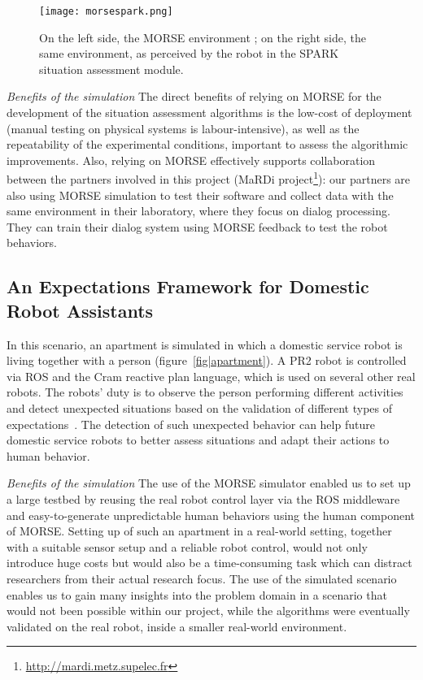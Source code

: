 \documentclass{llncs}
\begin{document}
\begin{figure}[t]
      \centering
      \texttt{[image: morsespark.png]}
      \caption{On the left side, the MORSE environment ; on the right side, the same
      environment, as perceived by the robot in the SPARK situation assessment
      module.}
      \label{fig|spark}
\end{figure}

\emph{Benefits of the simulation} The direct benefits of relying on MORSE for
the development of the situation assessment algorithms is the low-cost of
deployment (manual testing on physical systems is labour-intensive), as well as
the repeatability of the experimental conditions, important to assess the
algorithmic improvements.  Also, relying on MORSE effectively supports
collaboration between the partners involved in this project (MaRDi
project\footnote{\url{http://mardi.metz.supelec.fr}}): our partners are also
using MORSE simulation to test their software and collect data with the same
environment in their laboratory, where they focus on dialog processing. They can
train their dialog system using MORSE feedback to test the robot behaviors.

\subsection{An Expectations Framework for Domestic Robot Assistants}
\label{sc:expectations}

In this scenario, an apartment is simulated in which a domestic service robot is
living together with a person (figure~\ref{fig|apartment}).  A PR2 robot is
controlled via ROS and the {\sc Cram} reactive plan language, which is used on
several other real robots. The robots' duty is to observe the person performing
different activities and detect unexpected situations based on the validation of
different types of expectations~\cite{Karg2013}.  The detection of such
unexpected behavior can help future domestic service robots to better assess
situations and adapt their actions to human behavior.

\emph{Benefits of the simulation} The use of the MORSE simulator enabled us to
set up a large testbed by reusing the real robot control layer via the ROS
middleware and easy-to-generate unpredictable human behaviors using the human
component of MORSE. Setting up of such an apartment in a real-world setting,
together with a suitable sensor setup and a reliable robot control, would not
only introduce huge costs but would also be a time-consuming task which can
distract researchers from their actual research focus. The use of the simulated
scenario enables us to gain many insights into the problem domain in a scenario
that would not been possible within our project, while the algorithms were
eventually validated on the real robot, inside a smaller real-world environment.
\end{document}
